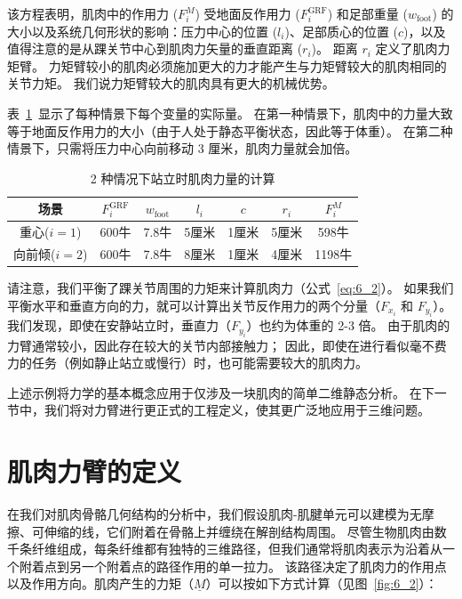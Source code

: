 该方程表明，肌肉中的作用力 ($F_i^M$) 受地面反作用力 ($F_i ^{\text{GRF}}$) 和足部重量 ($w_\text{foot}$) 的大小以及系统几何形状的影响：压力中心的位置 ($l_i$)、足部质心的位置 ($c$)，以及值得注意的是从踝关节中心到肌肉力矢量的垂直距离 ($r_i$)。
距离 $r_i$ 定义了肌肉力矩臂。
力矩臂较小的肌肉必须施加更大的力才能产生与力矩臂较大的肌肉相同的关节力矩。
我们说力矩臂较大的肌肉具有更大的机械优势。


表~\ref{tab:6_1}~显示了每种情景下每个变量的实际量。
在第一种情景下，肌肉中的力量大致等于地面反作用力的大小（由于人处于静态平衡状态，因此等于体重）。
在第二种情景下，只需将压力中心向前移动 3 厘米，肌肉力量就会加倍。


\begin{table}[htbp]
	\caption{2 种情况下站立时肌肉力量的计算} \label{tab:6_1} \centering
	\begin{tabular}{ccccccc} %
		\toprule
		场景 & $F_i^{\text{GRF}}$ & $w_\text{foot}$ & $l_i$ & $c$ & $r_i$ & $F_i^M$ \\
		\midrule
		重心($i=1$) & 600牛 &  7.8牛 & 5厘米 & 1厘米 & 5厘米 & 598牛 \\
		\midrule
		向前倾($i=2$) & 600牛 &  7.8牛 & 8厘米 & 1厘米 & 4厘米 & 1198牛 \\
		\bottomrule
	\end{tabular}
\end{table}


请注意，我们平衡了踝关节周围的力矩来计算肌肉力（公式~\ref{eq:6_2}）。
如果我们平衡水平和垂直方向的力，就可以计算出关节反作用力的两个分量（$F_{x_i}$ 和 $F_{y_i}$）。
我们发现，即使在安静站立时，垂直力（$F_{y_i}$）也约为体重的 2-3 倍。
由于肌肉的力臂通常较小，因此存在较大的关节内部接触力；
因此，即使在进行看似毫不费力的任务（例如静止站立或慢行）时，也可能需要较大的肌肉力。


上述示例将力学的基本概念应用于仅涉及一块肌肉的简单二维静态分析。
在下一节中，我们将对力臂进行更正式的工程定义，使其更广泛地应用于三维问题。



\section{肌肉力臂的定义}

在我们对肌肉骨骼几何结构的分析中，我们假设肌肉-肌腱单元可以建模为无摩擦、可伸缩的线，它们附着在骨骼上并缠绕在解剖结构周围。
尽管生物肌肉由数千条纤维组成，每条纤维都有独特的三维路径，但我们通常将肌肉表示为沿着从一个附着点到另一个附着点的路径作用的单一拉力。
该路径决定了肌肉力的作用点以及作用方向。肌肉产生的力矩（$ \underline{M} $）可以按如下方式计算（见图~\ref{fig:6_2}）：


